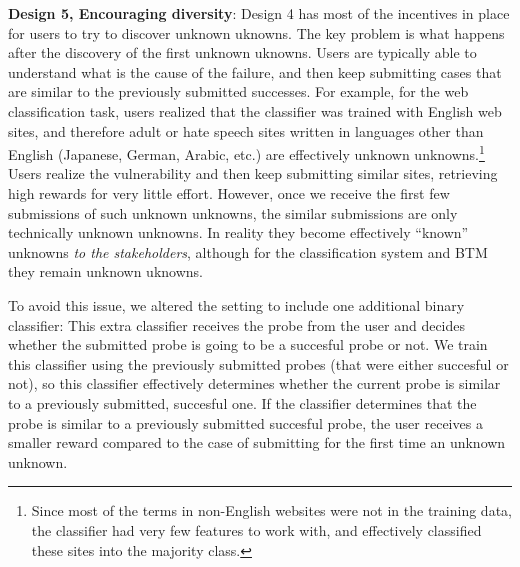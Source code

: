 \textbf{Design 5, Encouraging diversity}:  Design 4 has most of the incentives in place for users to try to discover unknown uknowns. The key problem is what happens after the 
discovery of the first unknown uknowns. Users are typically able to understand what is 
the cause of the failure, and then keep submitting cases that are similar to the previously submitted successes. For example, for the web classification task, users
realized that the classifier was trained with English web sites, and therefore
adult or hate speech sites written in languages other than English (Japanese, German, Arabic, etc.) are effectively unknown unknowns.\footnote{Since most of the terms in non-English websites were not in the training data, the classifier had very few features to work with, and effectively classified these sites into the majority class.} Users realize the vulnerability and then keep submitting similar sites, retrieving high rewards for very little effort. However, once we receive the first few submissions of such unknown unknowns, the similar submissions are only technically unknown unknowns. In reality they become effectively ``known'' unknowns \emph{to the stakeholders}, although for the classification system and BTM they remain unknown uknowns. 

To avoid this issue, we altered the setting to include one additional binary classifier: This extra classifier receives the probe from the user and decides whether the submitted probe is going to be a succesful probe or not. We train this classifier using the previously submitted probes (that were either succesful or not), so this classifier effectively determines whether the current probe is similar to a previously submitted, succesful one. If the classifier determines that the probe is similar to a previously submitted succesful probe, the user receives a smaller reward compared to the case of submitting for the first time an unknown unknown.




